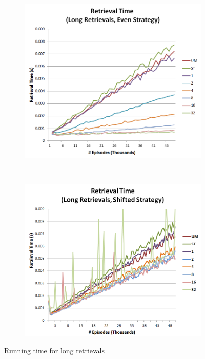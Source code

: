 \documentclass[11pt]{article} %
\begin{document}
\begin{figure}
        \centering
        \begin{subfigure}[b]{0.55\textwidth}
                \centering
                \includegraphics[width=\textwidth]{images/ret_long_eq}
                \label{fig:retleq}
        \end{subfigure}%
        ~ %
        \begin{subfigure}[b]{0.55\textwidth}
                \centering
                \includegraphics[width=\textwidth]{images/ret_long_shift}
                \label{fig:retlexp}
        \end{subfigure}
        \caption{Running time for long retrievals}\label{fig:animals}
	\label{fig:long}
\end{figure}
\end{document}
